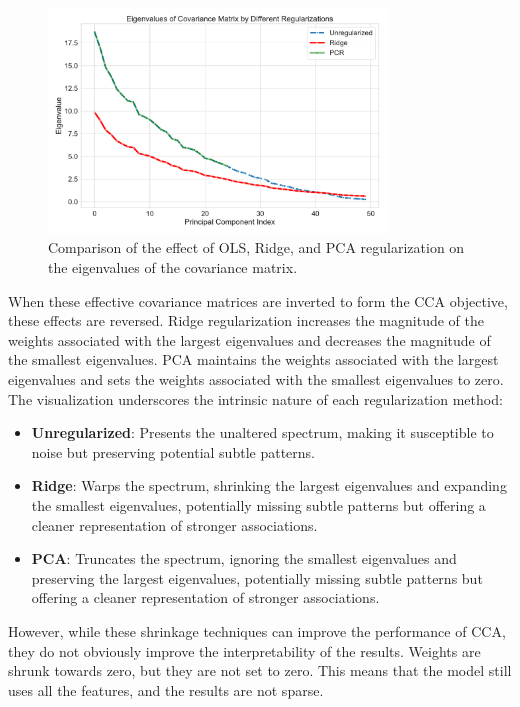\begin{figure}[h]
    \centering
    \includegraphics[width=0.8\textwidth]{figures/shrinkage/shrinkage}
    \caption{Comparison of the effect of OLS, Ridge, and PCA regularization on the eigenvalues of the covariance matrix.}\label{fig:shrinkage}
\end{figure}

When these effective covariance matrices are inverted to form the CCA objective, these effects are reversed.
Ridge regularization increases the magnitude of the weights associated with the largest eigenvalues and decreases the magnitude of the smallest eigenvalues.
PCA maintains the weights associated with the largest eigenvalues and sets the weights associated with the smallest eigenvalues to zero.
The visualization underscores the intrinsic nature of each regularization method:
\begin{itemize}
    \item \textbf{Unregularized}: Presents the unaltered spectrum, making it susceptible to noise but preserving potential subtle patterns.
    \item \textbf{Ridge}: Warps the spectrum, shrinking the largest eigenvalues and expanding the smallest eigenvalues, potentially missing subtle patterns but offering a cleaner representation of stronger associations.
    \item \textbf{PCA}: Truncates the spectrum, ignoring the smallest eigenvalues and preserving the largest eigenvalues, potentially missing subtle patterns but offering a cleaner representation of stronger associations.
\end{itemize}

However, while these shrinkage techniques can improve the performance of CCA, they do not obviously improve the interpretability of the results.
Weights are shrunk towards zero, but they are not set to zero.
This means that the model still uses all the features, and the results are not sparse.

